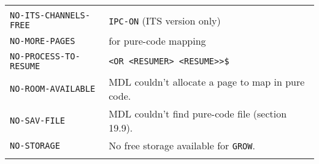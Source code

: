 \documentclass[a4paper]{scrbook}
\begin{document}
\begin{longtable}[]{@{}ll@{}}
\begin{minipage}[t]{0.36\columnwidth}
\end{minipage}\tabularnewline
\begin{minipage}[t]{0.58\columnwidth}\raggedright\strut
\texttt{NO-ITS-CHANNELS-FREE}\strut
\end{minipage} & \begin{minipage}[t]{0.36\columnwidth}\raggedright\strut
\texttt{IPC-ON} (ITS version only)\strut
\end{minipage}\tabularnewline
\begin{minipage}[t]{0.58\columnwidth}\raggedright\strut
\texttt{NO-MORE-PAGES}\strut
\end{minipage} & \begin{minipage}[t]{0.36\columnwidth}\raggedright\strut
for pure-code mapping\strut
\end{minipage}\tabularnewline
\begin{minipage}[t]{0.58\columnwidth}\raggedright\strut
\texttt{NO-PROCESS-TO-RESUME}\strut
\end{minipage} & \begin{minipage}[t]{0.36\columnwidth}\raggedright\strut
\texttt{\textless{}OR\ \textless{}RESUMER\textgreater{}\ \textless{}RESUME\textgreater{}\textgreater{}\$}\strut
\end{minipage}\tabularnewline
\begin{minipage}[t]{0.58\columnwidth}\raggedright\strut
\texttt{NO-ROOM-AVAILABLE}\strut
\end{minipage} & \begin{minipage}[t]{0.36\columnwidth}\raggedright\strut
MDL couldn't allocate a page to map in pure code.\strut
\end{minipage}\tabularnewline
\begin{minipage}[t]{0.58\columnwidth}\raggedright\strut
\texttt{NO-SAV-FILE}\strut
\end{minipage} & \begin{minipage}[t]{0.36\columnwidth}\raggedright\strut
MDL couldn't find pure-code file (section 19.9).\strut
\end{minipage}\tabularnewline
\begin{minipage}[t]{0.58\columnwidth}\raggedright\strut
\texttt{NO-STORAGE}\strut
\end{minipage} & \begin{minipage}[t]{0.36\columnwidth}\raggedright\strut
No free storage available for \texttt{GROW}.\strut
\end{minipage}\tabularnewline
\begin{minipage}[t]{0.58\columnwidth}\raggedright\strut

\end{minipage}
\end{longtable}
\end{document}
